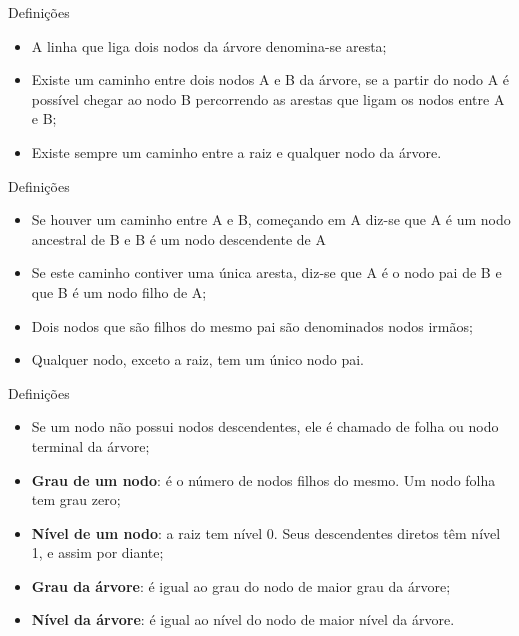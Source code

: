 \documentclass[12pt,table,xcolor={dvipsnames}]{beamer}
\begin{document}
\begin{frame}[fragile]{Definições}
          \begin{itemize}
		  \item A linha que liga dois nodos da árvore denomina-se aresta;
		  \item Existe um caminho entre dois nodos A e B da árvore, se a partir do nodo A é possível chegar ao nodo B percorrendo as arestas que ligam os nodos entre A e B;
		  \item Existe sempre um caminho entre a raiz e qualquer nodo da árvore.
          \end{itemize}
\end{frame} 

\begin{frame}[fragile]{Definições}
          \begin{itemize}
		  \item Se houver um caminho entre A e B, começando em A diz-se que A é um nodo ancestral de B e B é um nodo descendente de A
		  \item Se este caminho contiver uma única aresta, diz-se que A é o nodo pai de B e que B é um nodo filho de A; 
		  \item Dois nodos que são filhos do mesmo pai são denominados nodos irmãos;
		  \item Qualquer nodo, exceto a raiz, tem um único nodo pai.
          \end{itemize}
\end{frame} 

\begin{frame}[fragile]{Definições}
          \begin{itemize}
		  \item Se um nodo não possui nodos descendentes, ele é chamado de folha ou nodo terminal da árvore;
		  \item \textbf{Grau de um nodo}: é o número de nodos filhos do mesmo. Um nodo folha tem grau zero;
     	  \item \textbf{Nível de um nodo}: a raiz tem nível 0. Seus descendentes diretos têm nível 1, e assim por diante;
		  \item \textbf{Grau da árvore}: é igual ao grau do nodo de maior grau da árvore;
		  \item \textbf{Nível da árvore}: é igual ao nível do nodo de maior nível da árvore.
          \end{itemize}
\end{frame} 
\end{document}
